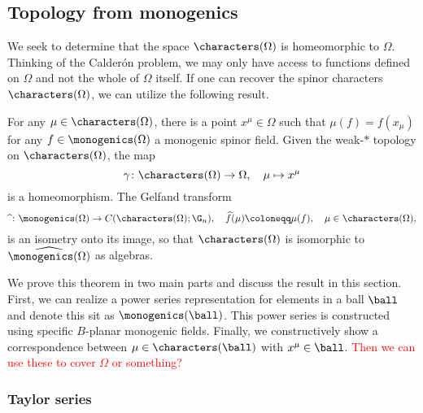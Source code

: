 \subsection{Topology from monogenics}

We seek to determine that the space $\characters(\Omega)$ is homeomorphic to $\Omega$.  Thinking of the Calder\'on problem, we may only have access to functions defined on $\Omega$ and not the whole of $\Omega$ itself.  If one can recover the spinor characters $\characters(\Omega)$, we can utilize the following result.

\begin{theorem}
For any $\mu \in \characters(\Omega)$, there is a point $x^\mu \in \Omega$ such that $\mu(f) = f(x_\mu)$ for any $f\in \monogenics(\Omega)$ a monogenic spinor field. Given the weak-$\ast$ topology on $\characters(\Omega)$, the map
\[
\gamma \colon \characters(\Omega) \to \Omega, \quad \mu \mapsto x^\mu
\]
is a homeomorphism. The Gelfand transform 
\[
\widehat{~} \colon \monogenics(\Omega) \to C(\characters(\Omega); \G_n), \quad \widehat{f}(\mu) \coloneqq \mu(f), \quad \mu \in \characters(\Omega),
\]
is an isometry onto its image, so that $\characters(\Omega)$ is isomorphic to $\widehat{\monogenics(\Omega)}$ as algebras.
\end{theorem}

We prove this theorem in two main parts and discuss the result in this section. First, we can realize a power series representation for elements in a ball $\ball$ and denote this sit as $\monogenics(\ball)$. This power series is constructed using specific $B$-planar monogenic fields. Finally, we constructively show a correspondence between $\mu \in \characters(\ball)$ with $x^\mu \in \ball$. \textcolor{red}{Then we can use these to cover $\Omega$ or something?}

\subsubsection{Taylor series}

